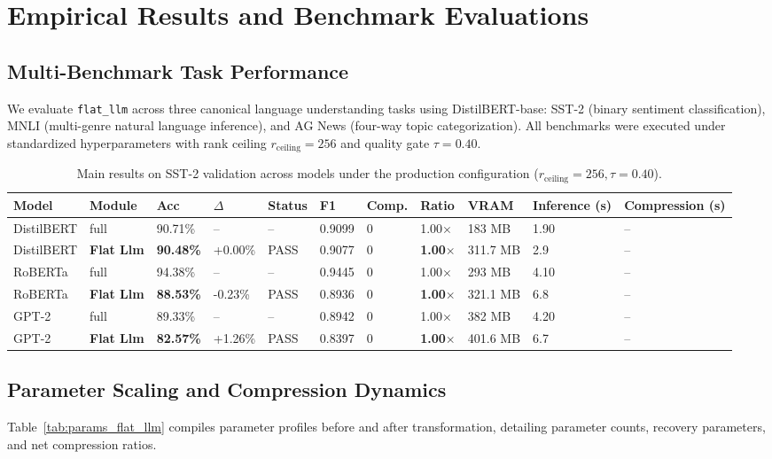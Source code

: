 \section{Empirical Results and Benchmark Evaluations}
\label{sec:results}

\subsection{Multi-Benchmark Task Performance}
We evaluate \texttt{flat\_llm} across three canonical language understanding tasks using DistilBERT-base: SST-2 (binary sentiment classification), MNLI (multi-genre natural language inference), and AG News (four-way topic categorization). All benchmarks were executed under standardized hyperparameters with rank ceiling $r_{\mathrm{ceiling}} = 256$ and quality gate $\tau = 0.40$.

\begin{table}[t]
\centering
\small
\begin{tabular}{lllllllllll}
\toprule
\textbf{Model} & \textbf{Module} & \textbf{Acc} & \textbf{$\Delta$} & \textbf{Status} & \textbf{F1} & \textbf{Comp.} & \textbf{Ratio} & \textbf{VRAM} & \textbf{Inference (s)} & \textbf{Compression (s)} \\
\midrule
DistilBERT & full & 90.71\% & -- & -- & 0.9099 & 0 & 1.00$\times$ & 183 MB & 1.90 & -- \\
DistilBERT & \textbf{Flat Llm} & \textbf{90.48\%} & +0.00\% & PASS & 0.9077 & 0 & \textbf{1.00$\times$} & 311.7 MB & 2.9 & -- \\
RoBERTa & full & 94.38\% & -- & -- & 0.9445 & 0 & 1.00$\times$ & 293 MB & 4.10 & -- \\
RoBERTa & \textbf{Flat Llm} & \textbf{88.53\%} & -0.23\% & PASS & 0.8936 & 0 & \textbf{1.00$\times$} & 321.1 MB & 6.8 & -- \\
GPT-2 & full & 89.33\% & -- & -- & 0.8942 & 0 & 1.00$\times$ & 382 MB & 4.20 & -- \\
GPT-2 & \textbf{Flat Llm} & \textbf{82.57\%} & +1.26\% & PASS & 0.8397 & 0 & \textbf{1.00$\times$} & 401.6 MB & 6.7 & -- \\
\bottomrule
\end{tabular}
\caption{Main results on SST-2 validation across models under the production configuration ($r_{\mathrm{ceiling}}=256, \tau=0.40$).}
\label{tab:main_sst2}
\end{table}

\subsection{Parameter Scaling and Compression Dynamics}
Table~\ref{tab:params_flat_llm} compiles parameter profiles before and after transformation, detailing parameter counts, recovery parameters, and net compression ratios.

